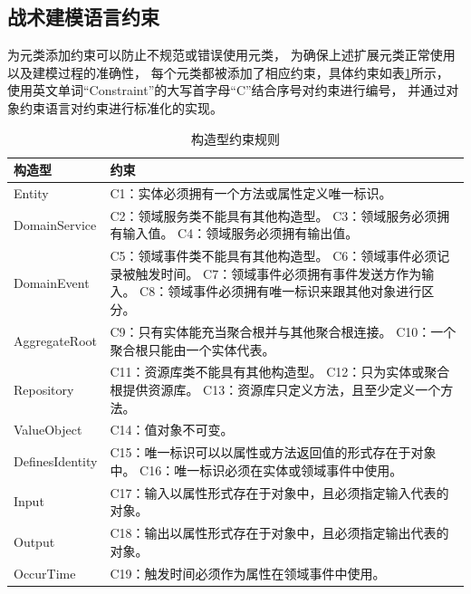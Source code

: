 \subsection{战术建模语言约束}

为元类添加约束可以防止不规范或错误使用元类，
为确保上述扩展元类正常使用以及建模过程的准确性，
每个元类都被添加了相应约束，具体约束如表\ref{stereotypeconstraint}所示，
使用英文单词“Constraint”的大写首字母“C”结合序号对约束进行编号，
并通过对象约束语言对约束进行标准化的实现。


{\footnotesize
\begin{longtable}[h]{m{90pt}|m{295pt}}
    \caption[构造型约束规则]{构造型约束规则} \label{stereotypeconstraint} \\
        \hline  
        构造型&约束\\
        \hline
        Entity&C1：实体必须拥有一个方法或属性定义唯一标识。\\
        \hline
        DomainService&C2：领域服务类不能具有其他构造型。
        \newline C3：领域服务必须拥有输入值。
        \newline C4：领域服务必须拥有输出值。\\
        \hline
        DomainEvent&C5：领域事件类不能具有其他构造型。
        \newline C6：领域事件必须记录被触发时间。
        \newline C7：领域事件必须拥有事件发送方作为输入。
        \newline C8：领域事件必须拥有唯一标识来跟其他对象进行区分。\\
        \hline
        AggregateRoot&C9：只有实体能充当聚合根并与其他聚合根连接。
        \newline C10：一个聚合根只能由一个实体代表。\\
        \hline
        Repository&C11：资源库类不能具有其他构造型。
        \newline C12：只为实体或聚合根提供资源库。
        \newline C13：资源库只定义方法，且至少定义一个方法。
        \\
        \hline
        ValueObject&C14：值对象不可变。\\
        \hline
        DefinesIdentity&C15：唯一标识可以以属性或方法返回值的形式存在于对象中。
        \newline C16：唯一标识必须在实体或领域事件中使用。\\
        \hline
        Input&C17：输入以属性形式存在于对象中，且必须指定输入代表的对象。\\
        \hline
        Output&C18：输出以属性形式存在于对象中，且必须指定输出代表的对象。\\   
        \hline
        OccurTime&C19：触发时间必须作为属性在领域事件中使用。\\
        \hline
    \end{longtable} 
}
